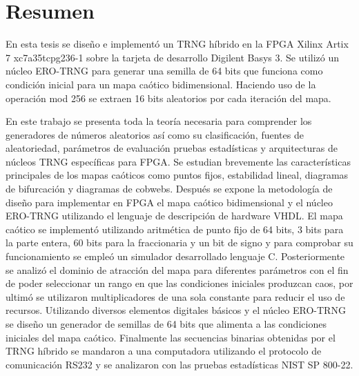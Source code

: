 \chapter{Resumen}
    
    En esta tesis se diseño e implementó un TRNG híbrido en la FPGA Xilinx Artix 7 xc7a35tcpg236-1 sobre la tarjeta de desarrollo Digilent Basys 3. Se utilizó un núcleo ERO-TRNG para generar una semilla de 64 bits que funciona como condición inicial para un mapa caótico bidimensional. Haciendo uso de la operación mod 256 se extraen 16 bits aleatorios por cada iteración del mapa. 

    En este trabajo se presenta toda la teoría necesaria para comprender los generadores de números aleatorios así como su clasificación, fuentes de aleatoriedad, parámetros de evaluación pruebas estadísticas y arquitecturas de núcleos TRNG específicas para FPGA. Se estudian brevemente las características principales de los mapas caóticos como puntos fijos, estabilidad lineal, diagramas de bifurcación y diagramas de cobwebs. Después se expone la metodología de diseño para implementar en FPGA el mapa caótico bidimensional y el núcleo ERO-TRNG utilizando el lenguaje de descripción de hardware VHDL. El mapa caótico se implementó utilizando aritmética de punto fijo de 64 bits, 3 bits para la parte entera, 60 bits para la fraccionaria y un bit de signo y para comprobar su funcionamiento se empleó un simulador desarrollado lenguaje C. Posteriormente se analizó el dominio de atracción del mapa para diferentes parámetros con el fin de poder seleccionar un rango en que las condiciones iniciales produzcan caos, por ultimó se utilizaron multiplicadores de una sola constante para reducir el uso de recursos. Utilizando diversos elementos digitales básicos y el núcleo ERO-TRNG se diseño un generador de semillas de 64 bits que alimenta a las condiciones iniciales del mapa caótico. Finalmente las secuencias binarias obtenidas por el TRNG híbrido se mandaron a una computadora utilizando el protocolo de comunicación RS232 y se analizaron con las pruebas estadísticas NIST SP 800-22.
